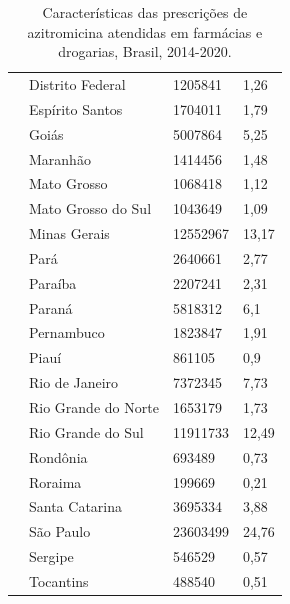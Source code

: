 \begin{table}[!htbp]
\begin{tabular}{llll}
                         & Distrito Federal                       & 1205841    & 1,26        \\
                         & Espírito Santos                        & 1704011    & 1,79        \\
                         & Goiás                                  & 5007864    & 5,25        \\
                         & Maranhão                               & 1414456    & 1,48        \\
                         & Mato Grosso                            & 1068418    & 1,12        \\
                         & Mato Grosso do Sul                     & 1043649    & 1,09        \\
                         & Minas Gerais                           & 12552967   & 13,17       \\
                         & Pará                                   & 2640661    & 2,77        \\
                         & Paraíba                                & 2207241    & 2,31        \\
                         & Paraná                                 & 5818312    & 6,1         \\
                         & Pernambuco                             & 1823847    & 1,91        \\
                         & Piauí                                  & 861105     & 0,9         \\
                         & Rio de Janeiro                         & 7372345    & 7,73        \\
                         & Rio Grande do Norte                    & 1653179    & 1,73        \\
                         & Rio Grande do Sul                      & 11911733   & 12,49       \\
                         & Rondônia                               & 693489     & 0,73        \\
                         & Roraima                                & 199669     & 0,21        \\
                         & Santa Catarina                         & 3695334    & 3,88        \\
                         & São Paulo                              & 23603499   & 24,76       \\
                         & Sergipe                                & 546529     & 0,57        \\
                         & Tocantins                              & 488540     & 0,51        \\ \hline
    \end{tabular}
    \caption{Características das prescrições de azitromicina atendidas em farmácias e drogarias, Brasil, 2014-2020.}
    \label{table:base_desc}
    \end{table}

